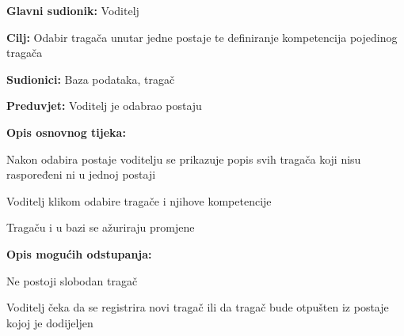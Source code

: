 					
					\noindent {}
					\begin{packed_item}
						
						\item \textbf{Glavni sudionik: } Voditelj
						\item  \textbf{Cilj:} Odabir tragača unutar jedne postaje te definiranje kompetencija pojedinog tragača
						\item  \textbf{Sudionici:} Baza podataka, tragač
						\item  \textbf{Preduvjet:} Voditelj je odabrao postaju
						\item  \textbf{Opis osnovnog tijeka:}
						
						\item[] \begin{packed_enum}
							
							\item Nakon odabira postaje voditelju se prikazuje popis svih tragača koji nisu raspoređeni ni u jednoj postaji
							\item Voditelj klikom odabire tragače i njihove kompetencije
							\item Tragaču i u bazi se ažuriraju promjene
						\end{packed_enum}
						
						\item  \textbf{Opis mogućih odstupanja:}
						
						\item[] \begin{packed_item}
							
							\item[1.a] Ne postoji slobodan tragač 
							\item[] \begin{packed_enum}
								
								\item  Voditelj čeka da se registrira novi tragač ili da tragač bude otpušten iz postaje kojoj je dodijeljen
								
								
							\end{packed_enum}
						
							
						\end{packed_item}
					\end{packed_item}
					
					\vspace{12pt}
					\vspace{12pt}
					\vspace{12pt}
					
